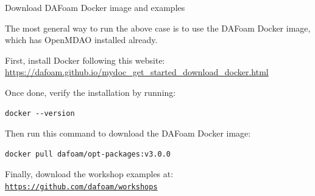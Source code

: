 \documentclass{bredelebeamer}
\begin{document}
\begin{frame}[fragile]{Download DAFoam Docker image and examples}

  The most general way to run the above case is to use the DAFoam Docker image, which has OpenMDAO installed already.

  First, install Docker following this website: \\ \vspace{0.1in} \small \url{https://dafoam.github.io/mydoc_get_started_download_docker.html} \normalsize

  Once done, verify the installation by running:
  \footnotesize
  \lstset{ language=bash }
  \begin{lstlisting}
docker --version
  \end{lstlisting}
  \normalsize
     
  Then run this command to download the DAFoam Docker image: 

  \footnotesize
  \lstset{ language=bash }
  \begin{lstlisting}
docker pull dafoam/opt-packages:v3.0.0
  \end{lstlisting}
  \normalsize
  
  Finally, download the workshop examples at: \\ \vspace{0.1in}
  \small \texttt{\url{https://github.com/dafoam/workshops}}

\end{frame}
\end{document}

